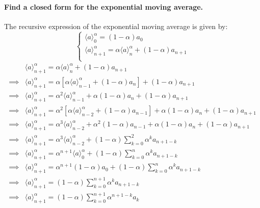 \documentclass{article}
\newcommand{\1}{\mathbf{1}}
\begin{document}
\paragraph{Find a closed form for the exponential moving average.}
The recursive expression of the exponential moving average is given by:
\begin{equation}
  \begin{cases}
    \langle a \rangle_0^{\alpha} = (1 - \alpha) a_0                                              \\
    \langle a \rangle_{n+1}^{\alpha} = \alpha \langle a \rangle_n^\alpha +  (1 - \alpha) a_{n+1} \\
  \end{cases}
\end{equation}
\begin{align*}
           & \langle a \rangle_{n+1}^{\alpha} = \alpha \langle a \rangle_n^\alpha +  (1 - \alpha) a_{n+1}                                                                       \\
  \implies &
  \langle a \rangle_{n+1}^{\alpha} = \alpha \left[ \alpha \langle a \rangle_{n-1}^\alpha +  (1 - \alpha) a_{n} \right] +  (1 - \alpha) a_{n+1}                                  \\
  \implies &
  \langle a \rangle_{n+1}^{\alpha} = \alpha^2 \langle a \rangle_{n-1}^\alpha +  \alpha (1 - \alpha) a_{n} +  (1 - \alpha) a_{n+1}                                               \\
  \implies &
  \langle a \rangle_{n+1}^{\alpha} = \alpha^2 \left[ \alpha \langle a \rangle_{n-2}^\alpha +  (1 - \alpha) a_{n-1} \right] +  \alpha (1 - \alpha) a_{n} +  (1 - \alpha) a_{n+1} \\
  \implies &
  \langle a \rangle_{n+1}^{\alpha} = \alpha^3 \langle a \rangle_{n-2}^\alpha + \alpha^2 (1 - \alpha) a_{n-1} +  \alpha (1 - \alpha) a_{n} +  (1 - \alpha) a_{n+1}               \\
  \implies &
  \langle a \rangle_{n+1}^{\alpha} = \alpha^3 \langle a \rangle_{n-2}^\alpha + (1-\alpha) \sum_{k=0}^{2} \alpha^k a_{n+1 - k}                                                   \\
  \implies &
  \langle a \rangle_{n+1}^{\alpha} = \alpha^{n+1} \langle a \rangle_{0}^\alpha + (1-\alpha) \sum_{k=0}^{n} \alpha^k a_{n+1 - k}                                                   \\
  \implies &
  \langle a \rangle_{n+1}^{\alpha} = \alpha^{n+1} (1-\alpha)a_0 + (1-\alpha) \sum_{k=0}^{n} \alpha^k a_{n+1 - k}                                                   \\
  \implies &
  \langle a \rangle_{n+1}^{\alpha} = (1-\alpha) \sum_{k=0}^{n+1} \alpha^k a_{n+1 - k}                                                   \\
  \implies &
  \langle a \rangle_{n+1}^{\alpha} = (1-\alpha) \sum_{k=0}^{n+1} \alpha^{n+1-k} a_{k}                                                   \\
\end{align*}
\end{document}
